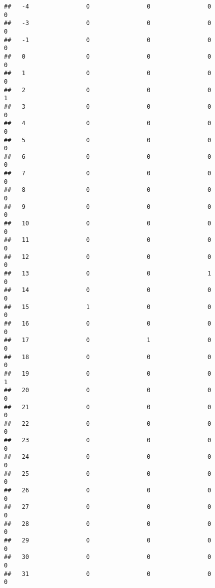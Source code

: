 \documentclass[]{article}
\begin{document}
\begin{verbatim}
##   -4                0                0                0                0
##   -3                0                0                0                0
##   -1                0                0                0                0
##   0                 0                0                0                0
##   1                 0                0                0                0
##   2                 0                0                0                1
##   3                 0                0                0                0
##   4                 0                0                0                0
##   5                 0                0                0                0
##   6                 0                0                0                0
##   7                 0                0                0                0
##   8                 0                0                0                0
##   9                 0                0                0                0
##   10                0                0                0                0
##   11                0                0                0                0
##   12                0                0                0                0
##   13                0                0                1                0
##   14                0                0                0                0
##   15                1                0                0                0
##   16                0                0                0                0
##   17                0                1                0                0
##   18                0                0                0                0
##   19                0                0                0                1
##   20                0                0                0                0
##   21                0                0                0                0
##   22                0                0                0                0
##   23                0                0                0                0
##   24                0                0                0                0
##   25                0                0                0                0
##   26                0                0                0                0
##   27                0                0                0                0
##   28                0                0                0                0
##   29                0                0                0                0
##   30                0                0                0                0
##   31                0                0                0                0

\end{verbatim}
\end{document}
